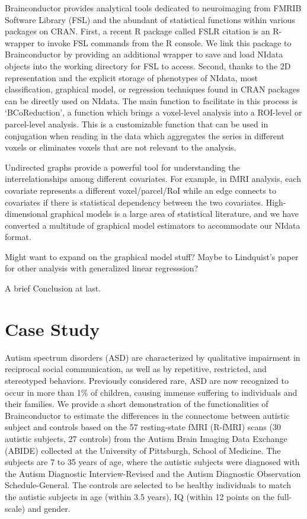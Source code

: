 \documentclass{nature}
\begin{document}
Brainconductor provides analytical tools dedicated to neuroimaging from
FMRIB Software Library (FSL) and the abundant of statistical functions within
various packages on CRAN. 
First, a recent R package called FSLR {\color{red}citation} is an R-wrapper to invoke
FSL commands from the R console. We link this package to Brainconductor by providing
an additional wrapper to save and load NIdata objects into the working directory for
FSL to access.
Second, thanks to the 2D representation and the explicit storage of
phenotypes of NIdata, most classification, graphical model, or regression
techniques
found in CRAN packages can be directly used on NIdata. The main function to
facilitate in this process is `BCoReduction', a function which brings a
voxel-level
analysis into a ROI-level or parcel-level analysis. This is a customizable
function
that can be used in conjugation when reading in the data which aggregates
the series
in different voxels or eliminates voxels that are not relevant to the analysis.


Undirected graphs provide a powerful tool for understanding the
interrelationships among
different covariates. For example, in fMRI analysis, each covariate represents 
a different voxel/parcel/RoI while an edge connects to covariates if there is
statistical dependency between the two covariates. High-dimensional graphical
models is a large area of statistical literature, and we have converted 
a multitude of graphical model estimators to accommodate our NIdata format.

{\color{red}Might want to expand on the graphical model stuff? Maybe to Lindquist's
paper for other analysis with generalized linear regresssion?}


{\color{red}A brief Conclusion at last.}

\section{Case Study}

Autism spectrum disorders (ASD) are characterized by qualitative impairment in
reciprocal social communication, as well as by repetitive, restricted, and
stereotyped behaviors. Previously considered rare, ASD are now recognized to
occur in more than 1\% of children, causing immense suffering to individuals and
their families. 
We provide a short demonstration of the functionalities of Brainconductor to
estimate the differences in the connectome between autistic subject and controls
based
on the 57 resting-state fMRI (R-fMRI) scans (30 autistic subjects, 27 controls)
from the Autism
Brain Imaging Data Exchange (ABIDE) collected at the 
University of Pittsburgh, School of Medicine\cite{di2014autism}. 
The subjects are 7 to 35 years of age, where the autistic subjects were
diagnosed with the Autism Diagnostic Interview-Revised and the Autism Diagnostic
Observation Schedule-General. The controls are selected to be healthy
individuals to match the autistic subjects in age (within 3.5 years), IQ (within
12 points on the full-scale) and gender.
\end{document}
